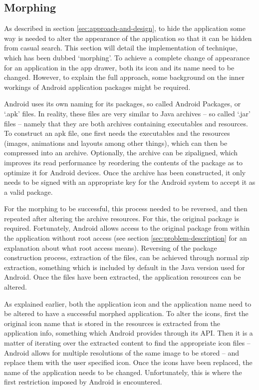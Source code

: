 \subsection{Morphing}
\label{sec:implementation:morphing}

As described in section \ref{sec:approach-and-design}, to hide the application some way is needed to alter the appearance of the application so that it can be hidden from casual search.
This section will detail the implementation of technique, which has been dubbed `morphing'.
To achieve a complete change of appearance for an application in the app drawer, both its icon and its name need to be changed. 
However, to explain the full approach, some background on the inner workings of Android application packages might be required.

Android uses its own naming for its packages, so called Android Packages, or `.apk' files.
In reality, these files are very similar to Java archives -- so called `.jar' files -- namely that they are both archives containing executables and resources.
To construct an apk file, one first needs the executables and the resources (images, animations and layouts among other things), which can then be compressed into an archive.
Optionally, the archive can be zipaligned, which improves its read performance by reordering the contents of the package as to optimize it for Android devices.
Once the archive has been constructed, it only needs to be signed with an appropriate key for the Android system to accept it as a valid package.

For the morphing to be successful, this process needed to be reversed, and then repeated after altering the archive resources.
For this, the original package is required. 
Fortunately, Android allows access to the original package from within the application without root access (see section \ref{sec:problem-description} for an explanation about what root access means).
Reversing of the package construction process, extraction of the files, can be achieved through normal zip extraction, something which is included by default in the Java version used for Android.
Once the files have been extracted, the application resources can be altered.

As explained earlier, both the application icon and the application name need to be altered to have a successful morphed application.
To alter the icons, first the original icon name that is stored in the resources is extracted from the application info, something which Android provides through its API.
Then it is a matter of iterating over the extracted content to find the appropriate icon files -- Android allows for multiple resolutions of the same image to be stored -- and replace them with the user specified icon.
Once the icons have been replaced, the name of the application needs to be changed.
Unfortunately, this is where the first restriction imposed by Android is encountered.


